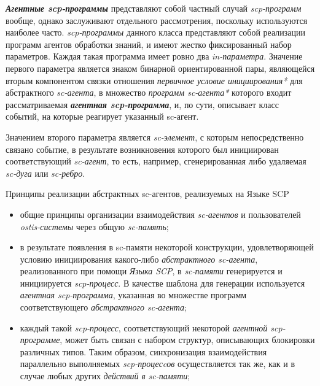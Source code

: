
\begin{frame}{}
\vspace{40pt}

\textbf{\textit{Агентные scp-программы}} представляют собой частный случай \textit{scp-программ} вообще, однако заслуживают отдельного рассмотрения, поскольку используются наиболее часто. \textit{scp-программы} данного класса представляют собой реализации программ агентов обработки знаний, и имеют жестко фиксированный набор параметров. Каждая такая программа имеет ровно два \textit{in-параметра\scnrolesign}. Значение первого параметра является знаком бинарной ориентированной пары, являющейся вторым компонентом связки отношения \textit{первичное условие инициирования*} для абстрактного \textit{sc-агента}, в множество \textit{программ sc-агента*} которого входит рассматриваемая \textbf{\textit{агентная scp-программа}}, и, по сути, описывает класс событий, на которые реагирует указанный sc-агент.
	
Значением второго параметра является \textit{sc-элемент}, с которым непосредственно связано событие, в результате возникновения которого был инициирован соответствующий \textit{sc-агент}, то есть, например, сгенерированная либо удаляемая \textit{sc-дуга} или \textit{sc-ребро}.
\end{frame}

\begin{frame}{Принципы реализации абстрактных sc-агентов, реализуемых на Языке SCP}
\topline
\vspace{30pt}

    \begin{itemize}
    \item общие принципы организации взаимодействия \textit{sc-агентов} и пользователей \textit{ostis-системы} через общую \textit{sc-память};
\item в результате появления в sc-памяти некоторой конструкции, удовлетворяющей условию инициирования какого-либо \textit{абстрактного sc-агента}, реализованного при помощи \textit{Языка SCP}, в \textit{sc-памяти} генерируется и инициируется \textit{scp-процесс}. В качестве шаблона для генерации используется \textit{агентная scp-программа}, указанная во множестве программ соответствующего \textit{абстрактного sc-агента};
\item каждый такой \textit{scp-процесс}, соответствующий некоторой \textit{агентной scp-программе}, может быть связан с набором структур, описывающих блокировки различных типов. Таким образом, синхронизация взаимодействия параллельно выполняемых \textit{scp-процесcов} осуществляется так же, как и в случае любых других \textit{действий в sc-памяти};
\end{itemize}
\end{frame}

